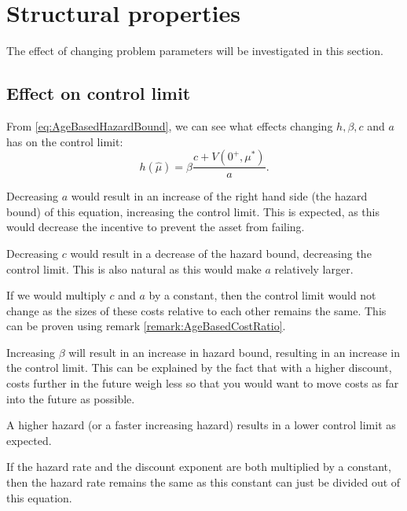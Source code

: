 \section{Structural properties}\label{section:AgeBasedStructuralProperties}
The effect of changing problem parameters will be investigated in this section.

\subsection{Effect on control limit}
From \eqref{eq:AgeBasedHazardBound}, we can see what effects changing $h,\beta,c$ and $a$ has on the control limit:
\[h(\hat{\mu})=\beta\frac{c+V(0^+,\mu^*)}{a}.\]
\begin{remark}
	Decreasing  $a$ would result in an increase of the right hand side (the hazard bound) of this equation, increasing the control limit.
	This is expected, as this would decrease the incentive to prevent the asset from failing.
\end{remark}
\begin{remark}
	Decreasing $c$ would result in a decrease of the hazard bound, decreasing the control limit.
	This is also natural as this would make $a$ relatively larger.
\end{remark}
\begin{remark}
	If we would multiply $c$ and $a$ by a constant, then the control limit would not change as the sizes of these costs relative to each other remains the same.
	This can be proven using remark \ref{remark:AgeBasedCostRatio}.
\end{remark}
\begin{remark}\label{remark:AgeBasedControlLimitDiscountIncrease}
	Increasing $\beta$ will result in an increase in hazard bound, resulting in an increase in the control limit.
	This can be explained by the fact that with a higher discount, costs further in the future weigh less so that you would want to move costs as far into the future as possible.
\end{remark}
\begin{remark}
	A higher hazard (or a faster increasing hazard) results in a lower control limit as expected.
\end{remark}
\begin{remark}\label{remark:AgeBasedControlLimitDiscountAndHazardIncrease}
	If the hazard rate and the discount exponent are both multiplied by a constant, then the hazard rate remains the same as this constant can just be divided out of this equation.
\end{remark}


